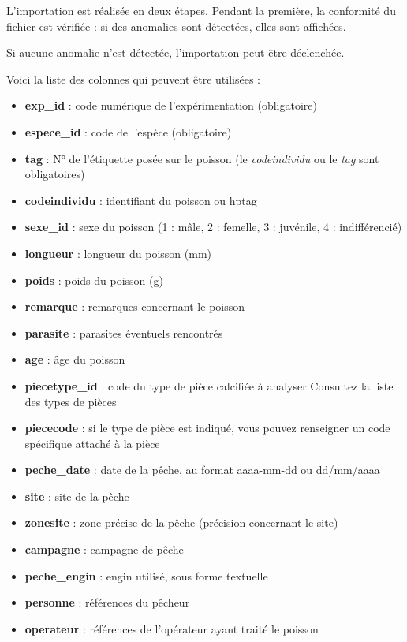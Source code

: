 L'importation est réalisée en deux étapes. Pendant la première, la conformité du fichier est vérifiée : si des anomalies sont détectées, elles sont affichées.

Si aucune anomalie n'est détectée, l'importation peut être déclenchée.

Voici la liste des colonnes qui peuvent être utilisées :

\begin{itemize}
\item \textbf{exp\_id} : code numérique de l'expérimentation (obligatoire)
\item  \textbf{espece\_id} : code de l'espèce (obligatoire)
\item     \textbf{tag} : N° de l'étiquette posée sur le poisson (le \textit{codeindividu} ou le \textit{tag} sont obligatoires)
\item     \textbf{codeindividu} : identifiant du poisson ou hptag
\item     \textbf{sexe\_id} : sexe du poisson (1 : mâle, 2 : femelle, 3 : juvénile, 4 : indifférencié)
 \item    \textbf{longueur} : longueur du poisson (mm)
\item     \textbf{poids} : poids du poisson (g)
 \item    \textbf{remarque} : remarques concernant le poisson
\item     \textbf{parasite} : parasites éventuels rencontrés
   \item  \textbf{age} : âge du poisson
  \item   \textbf{piecetype\_id} : code du type de pièce calcifiée à analyser Consultez la liste des types de pièces
   \item  \textbf{piececode} : si le type de pièce est indiqué, vous pouvez renseigner un code spécifique attaché à la pièce
  \item   \textbf{peche\_date} : date de la pêche, au format aaaa-mm-dd ou dd/mm/aaaa
   \item  \textbf{site} : site de la pêche
  \item   \textbf{zonesite} : zone précise de la pêche (précision concernant le site)
   \item  \textbf{campagne} : campagne de pêche
  \item   \textbf{peche\_engin} : engin utilisé, sous forme textuelle
   \item  \textbf{personne} : références du pêcheur
   \item  \textbf{operateur} : références de l'opérateur ayant traité le poisson
\end{itemize}

